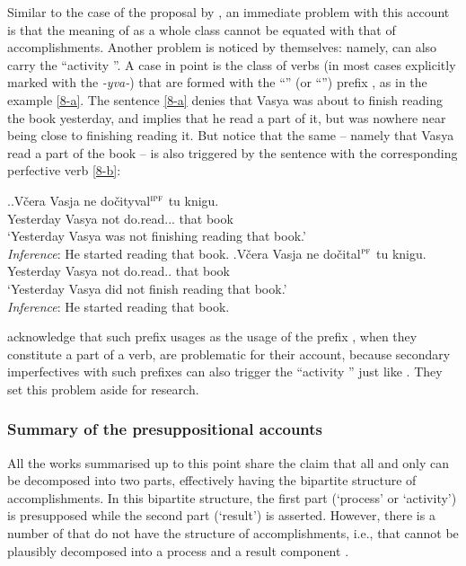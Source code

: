 Similar to the case of the proposal by \citet{Romanova:06}, an immediate problem with this account is that the meaning of  as a whole class cannot be equated with that of accomplishments. Another problem is noticed by \citet{Docekal:09} themselves: namely,  can also carry the ``activity ''. A case in point is the class of  verbs (in most cases explicitly marked with the  \textit{-yva-}) that are formed with the ``'' (or ``'') prefix , as in the example \ref{8-a}. The sentence \ref{8-a} denies that Vasya was about to finish reading the book yesterday, and implies that he read a part of it, but was nowhere near being close to finishing reading it. But notice that the same  -- namely that Vasya read a part of the book -- is also triggered by the sentence with the corresponding perfective verb \ref{8-b}:

\ex.\label{8}\ag.\label{8-a}V\v{c}era Vasja ne do\v{c}ityval$^{\textsc{ipf}}$ tu knigu.\\
Yesterday Vasya not do.read... that book\\
\trans `Yesterday Vasya was not finishing reading that book.'\\
\textit{Inference}: He started reading that book.
\bg.\label{8-b}V\v{c}era Vasja ne do\v{c}ital$^{\textsc{pf}}$ tu knigu.\\
Yesterday Vasya not do.read.. that book\\
\trans `Yesterday Vasya did not finish reading that book.'\\
\textit{Inference}: He started reading that book.

\citet{Docekal:09} acknowledge that such prefix usages as the  usage of the prefix , when they constitute a part of a  verb, are problematic for their account, because secondary imperfectives with such prefixes can also trigger the ``activity '' just like . They set this problem aside for  research. 

\subsubsection{Summary of the presuppositional accounts}
All the works summarised up to this point share the claim that all and only  can be decomposed into two parts, effectively having the bipartite structure of accomplishments. In this bipartite structure, the first part (`process' or `activity') is presupposed while the second part (`result') is asserted. However, there is a number of  that do not have the structure of accomplishments, i.e., that cannot be plausibly decomposed into a process and a result component \citep[see][and references therein]{Filip:00, FilipRothstein:05}. 

